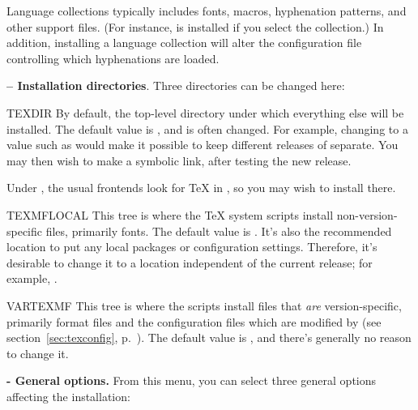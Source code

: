 \documentclass{article}
\begin{document}
\noindent Language collections typically includes fonts, macros,
hyphenation patterns, and other support files.  (For instance,
 is installed if you select the 
collection.)  In addition, installing a language collection will alter
the  configuration file controlling which
hyphenations are loaded.

\textbf{ -- Installation directories}.  Three directories can
be changed here:
\label{text:instdir}

\begin{ttdescription}
\item [TEXDIR] By default, the top-level directory under which
everything else will be installed.  The default value is
, and is often changed.  For example, changing to a
value such as  would make it possible to
keep different releases of \TeXLive{} separate.  You may then wish to
make  a symbolic link, after testing the new
release.

Under \MacOSX, the usual frontends look for \TeX{} in
, so you may wish to install \TeXLive{} there.

\item [TEXMFLOCAL] This tree is where the \TeX{} system scripts install
non-version-specific files, primarily fonts.  The default value is
.  It's also the recommended location to put
any local packages or configuration settings.  Therefore, it's desirable
to change it to a location independent of the current \TeXLive{}
release; for example, .

\item [VARTEXMF] This tree is where the scripts install files that
\emph{are} version-specific, primarily format files and the
configuration files which are modified by  (see
section~\ref{sec:texconfig}, p.~\pageref{sec:texconfig}).  The default
value is , and there's generally no reason to
change it.

\end{ttdescription}

\textbf{ - General options.}  From this menu, you can select
three general options affecting the installation:
\end{document}
